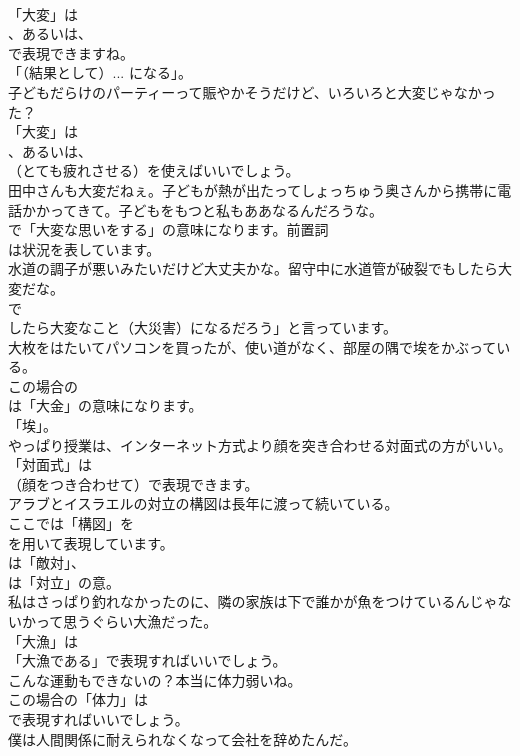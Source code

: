 \documentclass[8pt]{extreport}
\begin{document}
\begin{CJK}{UTF8}{min}
\\	「大変」は
\\	、あるいは、
\\	で表現できますね。
\\	「（結果として）... になる」。	
\\	子どもだらけのパーティーって賑やかそうだけど、いろいろと大変じゃなかった？ 
\\	「大変」は
\\	、あるいは、
\\	（とても疲れさせる）を使えばいいでしょう。	
\\	田中さんも大変だねぇ。子どもが熱が出たってしょっちゅう奥さんから携帯に電話かかってきて。子どもをもつと私もああなるんだろうな。 
\\	で「大変な思いをする」の意味になります。前置詞
\\	は状況を表しています。	
\\	水道の調子が悪いみたいだけど大丈夫かな。留守中に水道管が破裂でもしたら大変だな。 
\\	で
\\	したら大変なこと（大災害）になるだろう」と言っています。	
\\	大枚をはたいてパソコンを買ったが、使い道がなく、部屋の隅で埃をかぶっている。 
\\	この場合の
\\	は「大金」の意味になります。
\\	「埃」。	
\\	やっぱり授業は、インターネット方式より顔を突き合わせる対面式の方がいい。 
\\	「対面式」は
\\	（顔をつき合わせて）で表現できます。	
\\	アラブとイスラエルの対立の構図は長年に渡って続いている。 
\\	ここでは「構図」を 
\\	を用いて表現しています。
\\	は「敵対」、
\\	は「対立」の意。	
\\	私はさっぱり釣れなかったのに、隣の家族は下で誰かが魚をつけているんじゃないかって思うぐらい大漁だった。 
\\	「大漁」は
\\	「大漁である」で表現すればいいでしょう。	
\\	こんな運動もできないの？本当に体力弱いね。 
\\	この場合の「体力」は 
\\	で表現すればいいでしょう。	
\\	僕は人間関係に耐えられなくなって会社を辞めたんだ。 

\end{CJK}
\end{document}
